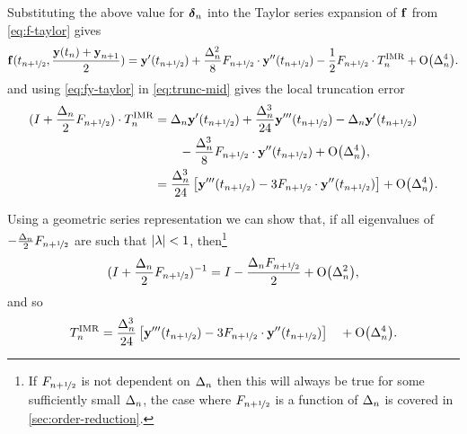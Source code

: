 Substituting the above value for $\dyn$ into the Taylor series expansion of $\fv$ from \cref{eq:f-taylor} gives
\begin{equation}
  \fv(\thf, \frac{\yv(t_n) + \yv_{n+1}}{2}) = \yvhf[']
  + \frac{\dtn^2}{8} \dfdyhf \cdot \yvhf[''] - \frac{1}{2} \dfdyhf \cdot \lte^\imr + \order{\dtn^4}
  . \label{eq:fy-taylor}
\end{equation}
and using \cref{eq:fy-taylor} in \cref{eq:trunc-mid} gives the local truncation error
\begin{equation}
  \begin{aligned}
    (I + \frac{\dtn}{2}\dfdyhf) \cdot\lte^\imr
    &= \dtn \yvhf['] + \frac{\dtn^3}{24} \yvhf['''] - \dtn \yvhf['] \\
    &\qquad- \frac{\dtn^3}{8} \dfdyhf \cdot \yvhf[''] + \order{\dtn^4}, \\
    &= \frac{\dtn^3}{24} \left[\yvhf['''] - 3 \dfdyhf \cdot \yvhf[''] \right]
    + \order{\dtn^4}.
    \label{eq:trunc-implicit-form}
  \end{aligned}
\end{equation}

Using a geometric series representation we can show that, if all eigenvalues of  $-\frac{\dtn}{2}\dfdyhf$ are such that $\abs{\lambda} < 1$, then\footnote{If $\dfdyhf$ is not dependent on $\dtn$ then this will always be true for some sufficiently small $\dtn$, the case where $\dfdyhf$ is a function of $\dtn$ is covered in \cref{sec:order-reduction}.} \cite{??ds}
\begin{equation}
  (I + \frac{\dtn}{2}\dfdyhf)^{-1} = I - \frac{\dtn \dfdyhf}{2}  + \order{\dtn^2},
\end{equation}
and so
\begin{equation}
  \lte^\imr = \frac{\dtn^3}{24} \left[\yvhf['''] - 3 \dfdyhf \cdot \yvhf[''] \right]
  \quad +\order{\dtn^4}.
\end{equation}

